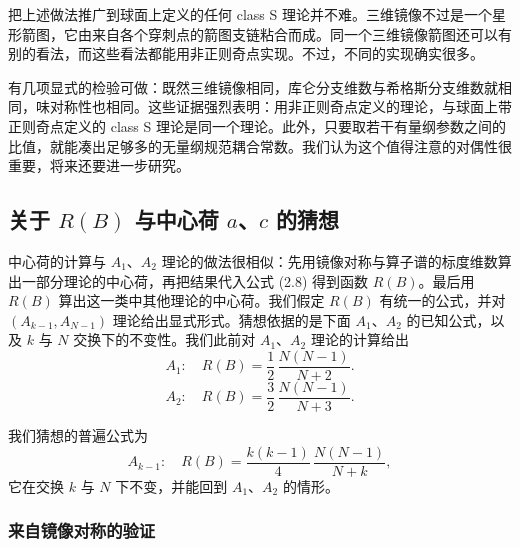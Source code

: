 把上述做法推广到球面上定义的任何 class S 理论并不难。三维镜像不过是一个星形箭图，它由来自各个穿刺点的箭图支链粘合而成。同一个三维镜像箭图还可以有别的看法，而这些看法都能用非正则奇点实现。不过，不同的实现确实很多。

有几项显式的检验可做：既然三维镜像相同，库仑分支维数与希格斯分支维数就相同，味对称性也相同。这些证据强烈表明：用非正则奇点定义的理论，与球面上带正则奇点定义的 class S 理论是同一个理论。此外，只要取若干有量纲参数之间的比值，就能凑出足够多的无量纲规范耦合常数。我们认为这个值得注意的对偶性很重要，将来还要进一步研究。

\subsection{关于 $R(B)$ 与中心荷 $a$、$c$ 的猜想}
\label{sec:6.4}

中心荷的计算与 $A_1$、$A_2$ 理论的做法很相似：先用镜像对称与算子谱的标度维数算出一部分理论的中心荷，再把结果代入公式 (2.8) 得到函数 $R(B)$。最后用 $R(B)$ 算出这一类中其他理论的中心荷。我们假定 $R(B)$ 有统一的公式，并对 $(A_{k-1},A_{N-1})$ 理论给出显式形式。猜想依据的是下面 $A_1$、$A_2$ 的已知公式，以及 $k$ 与 $N$ 交换下的不变性。我们此前对 $A_1$、$A_2$ 理论的计算给出
\begin{equation}
A_1:\quad R(B) = \frac{1}{2}\,\frac{N(N-1)}{N+2} .
\label{eq:6.33}\tag{6.33}
\end{equation}
\begin{equation}
A_2:\quad R(B) = \frac{3}{2}\,\frac{N(N-1)}{N+3} .
\label{eq:6.34}\tag{6.34}
\end{equation}

我们猜想的普遍公式为
\begin{equation}
A_{k-1}:\quad R(B) = \frac{k(k-1)}{4}\,\frac{N(N-1)}{N+k} ,
\label{eq:6.35}\tag{6.35}
\end{equation}
它在交换 $k$ 与 $N$ 下不变，并能回到 $A_1$、$A_2$ 的情形。

\subsubsection{来自镜像对称的验证}
\label{sec:6.4.1}

